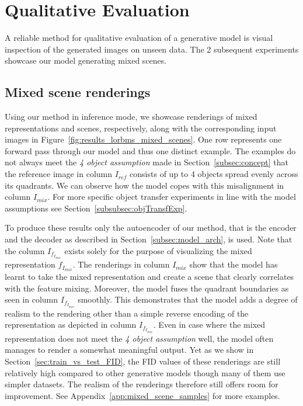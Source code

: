 \documentclass[a4paper,12pt]{report}
\begin{document}

\section{Qualitative Evaluation}\label{subsec:qual_eval}
A reliable method for qualitative evaluation of a generative model is visual inspection of the generated images on unseen data. The 2 subsequent experiments showcase our model generating mixed scenes.

\subsection{Mixed scene renderings}\label{sec:scene_renderings}
Using our method in inference mode, we showcase renderings of mixed representations and scenes, respectively, along with the corresponding input images in Figure~\ref{fig:results_lorbms_mixed_scenes}. One row represents one forward pass through our model and thus one distinct example. The examples do not always meet the \textit{4 object assumption} made in Section~\ref{subsec:concept} that the reference image in column $I_{ref}$ consists of up to 4 objects spread evenly across its quadrants. We can observe how the model copes with this misalignment in column $I_{mix}$. For more specific object transfer experiments in line with the model assumptions see Section~\ref{subsubsec:objTransfExp}. 

To produce these results only the autoencoder of our method, that is the encoder and the decoder as described in Section~\ref{subsec:model_arch}, is used. Note that the column $I_{f_{I_{mix}}}$ exists solely for the purpose of visualizing the mixed representation $f_{I_{mix}}$. The renderings in column $I_{mix}$ show that the model has learnt to take the mixed representation and create a scene that clearly correlates with the feature mixing. Moreover, the model fuses the quadrant boundaries as seen in column $I_{f_{I_{mix}}}$ smoothly. This demonstrates that the model adds a degree of realism to the rendering other than a simple reverse encoding of the representation as depicted in column $I_{f_{I_{mix}}}$. Even in case where the mixed representation does not meet the \textit{4 object assumption} well, the model often manages to render a somewhat meaningful output. Yet as we show in Section~\ref{sec:train_vs_test_FID}, the FID values of these renderings are still relatively high compared to other generative models though many of them use simpler datasets. The realism of the renderings therefore still offers room for improvement.
See Appendix~\ref{app:mixed_scene_samples} for more examples.
\end{document}
